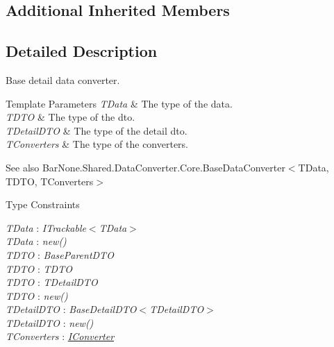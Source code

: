 \subsection*{Additional Inherited Members}


\subsection{Detailed Description}
Base detail data converter. 


\begin{DoxyTemplParams}{Template Parameters}
{\em T\+Data} & The type of the data.\\
\hline
{\em T\+D\+TO} & The type of the dto.\\
\hline
{\em T\+Detail\+D\+TO} & The type of the detail dto.\\
\hline
{\em T\+Converters} & The type of the converters.\\
\hline
\end{DoxyTemplParams}
\begin{DoxySeeAlso}{See also}
Bar\+None.\+Shared.\+Data\+Converter.\+Core.\+Base\+Data\+Converter$<$\+T\+Data, T\+D\+T\+O, T\+Converters$>$


\end{DoxySeeAlso}
\begin{Desc}
\item[Type Constraints]\begin{description}
\item[{\em T\+Data} : {\em I\+Trackable$<$T\+Data$>$}]\item[{\em T\+Data} : {\em new()}]\item[{\em T\+D\+TO} : {\em Base\+Parent\+D\+TO}]\item[{\em T\+D\+TO} : {\em T\+D\+TO}]\item[{\em T\+D\+TO} : {\em T\+Detail\+D\+TO}]\item[{\em T\+D\+TO} : {\em new()}]\item[{\em T\+Detail\+D\+TO} : {\em Base\+Detail\+D\+TO$<$T\+Detail\+D\+TO$>$}]\item[{\em T\+Detail\+D\+TO} : {\em new()}]\item[{\em T\+Converters} : {\em \mbox{\hyperlink{interface_bar_none_1_1_shared_1_1_data_converter_1_1_core_1_1_i_converter}{I\+Converter}}}]\end{description}
\end{Desc}


